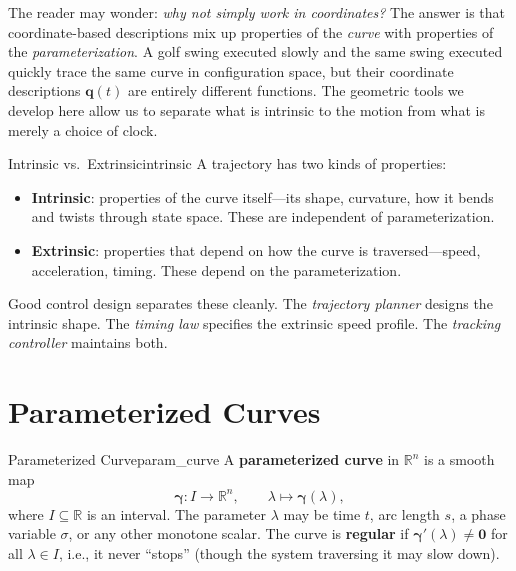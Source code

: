 \documentclass[12pt, openany]{book}
\theoremstyle{plain}
\newcommand{\traj}{\bm{\gamma}}
\newcommand{\Reals}{\mathbb{R}}
\begin{document}
The reader may wonder: \emph{why not simply work in coordinates?} The answer is
that coordinate-based descriptions mix up properties of the \emph{curve} with
properties of the \emph{parameterization}. A golf swing executed slowly and the
same swing executed quickly trace the same curve in configuration space, but
their coordinate descriptions $\bm{q}(t)$ are entirely different functions. The
geometric tools we develop here allow us to separate what is intrinsic to the
motion from what is merely a choice of clock.

\begin{keyidea}{Intrinsic vs.\ Extrinsic}{intrinsic}
  A trajectory has two kinds of properties:
  \begin{itemize}[leftmargin=1cm]
    \item \textbf{Intrinsic}: properties of the curve itself---its shape,
      curvature, how it bends and twists through state space. These are
      independent of parameterization.
    \item \textbf{Extrinsic}: properties that depend on how the curve is
      traversed---speed, acceleration, timing. These depend on the
      parameterization.
  \end{itemize}
  Good control design separates these cleanly. The \emph{trajectory planner}
  designs the intrinsic shape. The \emph{timing law} specifies the extrinsic
  speed profile. The \emph{tracking controller} maintains both.
\end{keyidea}

\section{Parameterized Curves}

\begin{definition}{Parameterized Curve}{param_curve}
  A \textbf{parameterized curve} in $\Reals^n$ is a smooth map
  \begin{equation}
    \traj: I \to \Reals^n, \qquad \lambda \mapsto \traj(\lambda),
  \end{equation}
  where $I \subseteq \Reals$ is an interval. The parameter $\lambda$ may be time $t$,
  arc length $s$, a phase variable $\sigma$, or any other monotone scalar.
  The curve is \textbf{regular} if $\traj'(\lambda) \neq \bm{0}$ for all
  $\lambda \in I$, i.e., it never ``stops'' (though the system traversing it may
  slow down).
\end{definition}
\end{document}
